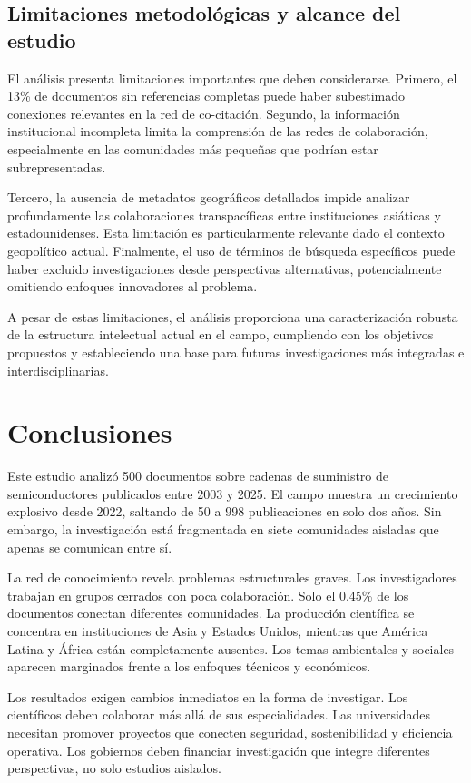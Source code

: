 \documentclass[twoside, twocolumn]{article}
\newcommand{\1}{\mathds{1}}						%
\begin{document}
\subsection{Limitaciones metodológicas y alcance del estudio}
El análisis presenta limitaciones importantes que deben considerarse. Primero, el 13\% de documentos sin referencias completas puede haber subestimado conexiones relevantes en la red de co-citación. Segundo, la información institucional incompleta limita la comprensión de las redes de colaboración, especialmente en las comunidades más pequeñas que podrían estar subrepresentadas.

Tercero, la ausencia de metadatos geográficos detallados impide analizar profundamente las colaboraciones transpacíficas entre instituciones asiáticas y estadounidenses. Esta limitación es particularmente relevante dado el contexto geopolítico actual. Finalmente, el uso de términos de búsqueda específicos puede haber excluido investigaciones desde perspectivas alternativas, potencialmente omitiendo enfoques innovadores al problema.

A pesar de estas limitaciones, el análisis proporciona una caracterización robusta de la estructura intelectual actual en el campo, cumpliendo con los objetivos propuestos y estableciendo una base para futuras investigaciones más integradas e interdisciplinarias.

\section{Conclusiones}

Este estudio analizó 500 documentos sobre cadenas de suministro de semiconductores publicados entre 2003 y 2025. El campo muestra un crecimiento explosivo desde 2022, saltando de 50 a 998 publicaciones en solo dos años. Sin embargo, la investigación está fragmentada en siete comunidades aisladas que apenas se comunican entre sí.

La red de conocimiento revela problemas estructurales graves. Los investigadores trabajan en grupos cerrados con poca colaboración. Solo el 0.45\% de los documentos conectan diferentes comunidades. La producción científica se concentra en instituciones de Asia y Estados Unidos, mientras que América Latina y África están completamente ausentes. Los temas ambientales y sociales aparecen marginados frente a los enfoques técnicos y económicos.

Los resultados exigen cambios inmediatos en la forma de investigar. Los científicos deben colaborar más allá de sus especialidades. Las universidades necesitan promover proyectos que conecten seguridad, sostenibilidad y eficiencia operativa. Los gobiernos deben financiar investigación que integre diferentes perspectivas, no solo estudios aislados.
\end{document}
